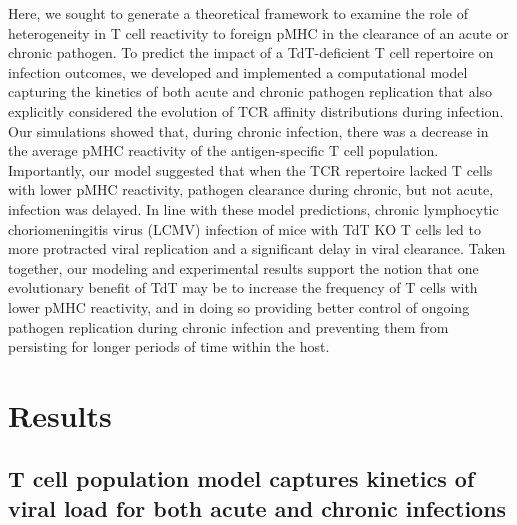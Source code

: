Here, we sought to generate a theoretical framework to examine the role of heterogeneity in T cell reactivity to foreign pMHC in the clearance of an acute or chronic pathogen. To predict the impact of a TdT-deficient T cell repertoire on infection outcomes, we developed and implemented a computational model capturing the kinetics of both acute and chronic pathogen replication that also explicitly considered the evolution of TCR affinity distributions during infection. Our simulations showed that, during chronic infection, there was a decrease in the average pMHC reactivity of the antigen-specific T cell population. Importantly, our model suggested that when the TCR repertoire lacked T cells with lower pMHC reactivity, pathogen clearance during chronic, but not acute, infection was delayed. In line with these model predictions, chronic lymphocytic choriomeningitis virus (LCMV) infection of mice with TdT KO T cells led to more protracted viral replication and a significant delay in viral clearance. Taken together, our modeling and experimental results support the notion that one evolutionary benefit of TdT may be to increase the frequency of T cells with lower pMHC reactivity, and in doing so providing better control of ongoing pathogen replication during chronic infection and preventing them from persisting for longer periods of time within the host.


\section{Results}

\subsection{T cell population model captures kinetics of viral load for both acute and chronic infections}

